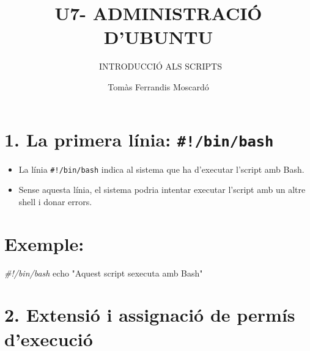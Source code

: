 \documentclass[
  12 pt,
  a4paper,
]{article}
\title{U7- ADMINISTRACIÓ D'UBUNTU}
\subtitle{~INTRODUCCIÓ ALS SCRIPTS}
\author{Tomàs Ferrandis Moscardó}
\date{}
\newenvironment{Shaded}{\begin{snugshade}}{\end{snugshade}}
\newcommand{\BuiltInTok}[1]{#1}
\newcommand{\CommentTok}[1]{\textcolor[rgb]{0.56,0.35,0.01}{\textit{#1}}}
\newcommand{\StringTok}[1]{\textcolor[rgb]{0.31,0.60,0.02}{#1}}
\providecommand{\tightlist}{%
  \setlength{\itemsep}{0pt}\setlength{\parskip}{0pt}}
\begin{document}
\maketitle

\section{\texorpdfstring{1. La primera línia:
\texttt{\#!/bin/bash}}{1. La primera línia: \#!/bin/bash}}\label{la-primera-luxednia-binbash}

\begin{itemize}
\tightlist
\item
  La línia \texttt{\#!/bin/bash} indica al sistema que ha d'executar
  l'script amb Bash.\\
\item
  Sense aquesta línia, el sistema podria intentar executar l'script amb
  un altre shell i donar errors.
\end{itemize}

\section{Exemple:}\label{exemple}

\begin{Shaded}
\begin{Highlighting}[]
\CommentTok{\#!/bin/bash}
\BuiltInTok{echo} \StringTok{"Aquest script s\textquotesingle{}executa amb Bash"}
\end{Highlighting}
\end{Shaded}

\section{2. Extensió i assignació de permís
d'execució}\label{extensiuxf3-i-assignaciuxf3-de-permuxeds-dexecuciuxf3}
\end{document}
